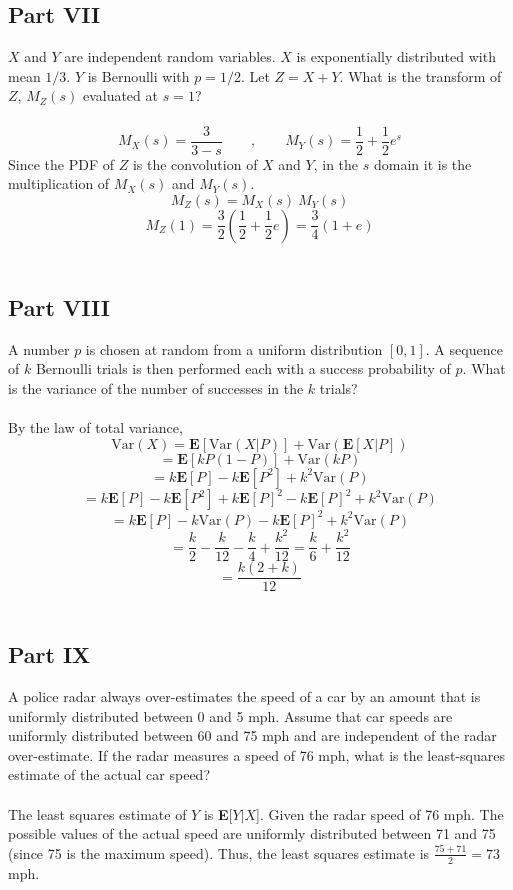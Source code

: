 \documentclass{amsart}
\begin{document}
	\subsection{Part VII}
	$X$ and $Y$ are independent random variables. $X$ is exponentially distributed with mean $1/3$. $Y$ is Bernoulli with $p=1/2$. Let $Z=X+Y$. What is the transform of $Z$, $M_Z(s)$ evaluated at $s=1$?\\
	\\
	\[
	M_X(s) = \frac{3}{3-s} \qquad, \qquad M_Y(s) = \frac{1}{2}+\frac{1}{2}e^s
	\]
	Since the PDF of $Z$ is the convolution of $X$ and $Y$, in the $s$ domain it is the multiplication of $M_X(s)$ and $M_Y(s)$.
	\[
	M_Z(s) = M_X(s)~M_Y(s)
	\]
	\[
	M_Z(1) = \frac{3}{2}\left(\frac{1}{2}+\frac{1}{2}e\right)=
	\frac{3}{4}(1+e)
	\]
	\\
	\subsection{Part VIII}
	A number $p$ is chosen at random from a uniform distribution $[0,1]$. A sequence of $k$ Bernoulli trials is then performed each with a success probability of $p$. What is the variance of the number of successes in the $k$ trials?\\
	\\
	By the law of total variance,
	\[
	\text{Var}(X) = \textbf{E}[\text{Var}(X|P)] + \text{Var}(\mathbf{E}[X|P])
	\]
	\[
	= \textbf{E}[kP(1-P)] + \text{Var}(kP)
	\]
	\[
	=k\textbf{E}[P] - k\textbf{E}[P^2] + k^2\text{Var}(P)
	\]
	\[
	=k\textbf{E}[P] -k\textbf{E}[P^2] + k\textbf{E}[P]^2 - k\textbf{E}[P]^2 + k^2\text{Var}(P)
	\]
	\[
	=k\textbf{E}[P] - k\text{Var}(P) -k\textbf{E}[P]^2 + k^2\text{Var}(P)
	\]
	\[
	=\frac{k}{2} - \frac{k}{12} - \frac{k}{4} + \frac{k^2}{12} = \frac{k}{6}+\frac{k^2}{12}
	\]
	\[
	=\frac{k(2+k)}{12}
	\]
	\\
	\subsection{Part IX}
	A police radar always over-estimates the speed of a car by an amount that is uniformly distributed between 0 and 5 mph. Assume that car speeds are uniformly distributed between 60 and 75 mph and are independent of the radar over-estimate. If the radar measures a speed of 76 mph, what is the least-squares estimate of the actual car speed?\\
	\\
	The least squares estimate of $Y$ is \textbf{E}[$Y|X$]. Given the radar speed of 76 mph. The possible values of the actual speed are uniformly distributed between 71 and 75 (since 75 is the maximum speed). Thus, the least squares estimate is $\frac{75+71}{2} = 73$ mph.
	\\
\end{document}
